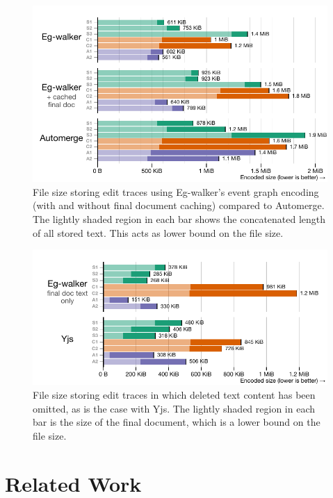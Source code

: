 \documentclass[sigplan,10pt]{acmart}
\newcommand{\algname}{Eg-walker\xspace}
\begin{document}
\begin{figure}
  \includegraphics[width=\linewidth]{diagrams/filesize_full.pdf}
  \caption{File size storing edit traces using \algname's event graph encoding (with and without final document caching) compared to Automerge. The lightly shaded region in each bar shows the concatenated length of all stored text. This acts as lower bound on the file size.}
  \label{chart-dt-vs-automerge}
\end{figure}

\begin{figure}
  \includegraphics[width=\linewidth]{diagrams/filesize_smol.pdf}
  \caption{File size storing edit traces in which deleted text content has been omitted, as is the case with Yjs. The lightly shaded region in each bar is the size of the final document, which is a lower bound on the file size.}
  \label{chart-dt-vs-yjs}
\end{figure}


\section{Related Work}\label{related-work}
\end{document}
